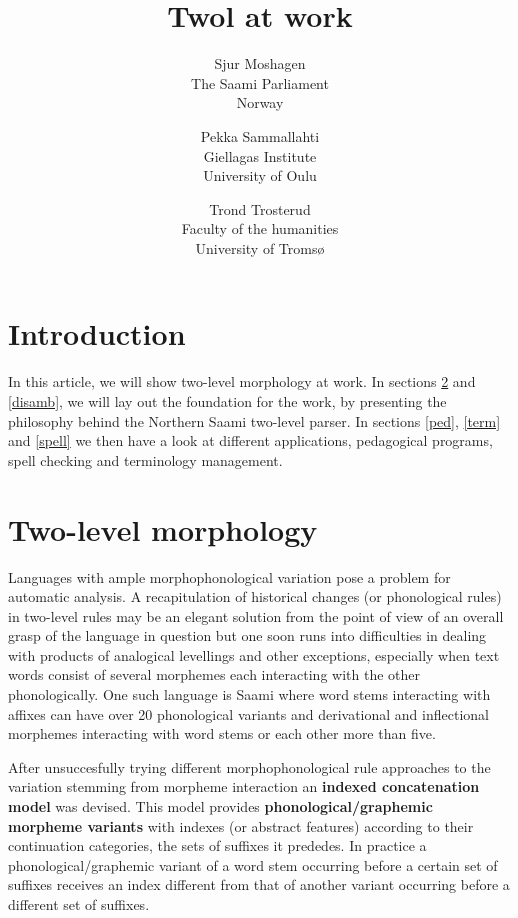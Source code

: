 \documentclass[a4paper,english]{article}
\begin{document}
\title{Twol at work}

\author{Sjur Moshagen\\ The Saami Parliament\\ Norway
\and Pekka Sammallahti\\ Giellagas Institute\\ University of Oulu
\and Trond Trosterud\\ Faculty of the humanities\\ University of Tromsø}


\maketitle


\section{Introduction}

In this article, we will show two-level morphology at work. In sections \ref{twol} and \ref{disamb}, we will lay out the foundation for the work, by presenting the philosophy behind the Northern Saami two-level parser. In sections \ref{ped}, \ref{term} and \ref{spell} we then have a look at different applications, pedagogical programs, spell checking and terminology management.

\section{Two-level morphology}\label{twol}

Languages with ample morphophonological variation pose a problem for automatic analysis. A recapitulation of historical changes (or phonological rules) in two-level rules may be an elegant solution from the point of view of an overall grasp of the language in question but one soon runs into difficulties in dealing with products of analogical levellings and other exceptions, especially when text words consist of several morphemes each interacting with the other phonologically. One such language is Saami where word stems interacting with affixes can have over 20 phonological variants and derivational and inflectional morphemes interacting with word stems or each other more than five. 

After unsuccesfully trying different morphophonological rule approaches to the variation stemming from morpheme interaction an \textbf{indexed concatenation model} was devised. This model provides \textbf{phonological/graphemic morpheme variants} with indexes (or abstract features) according to their continuation categories, the sets of suffixes it prededes. In practice a phonological/graphemic variant of a word stem occurring before a certain set of suffixes receives an index different from that of another variant occurring before a different set of suffixes. 
\end{document}
